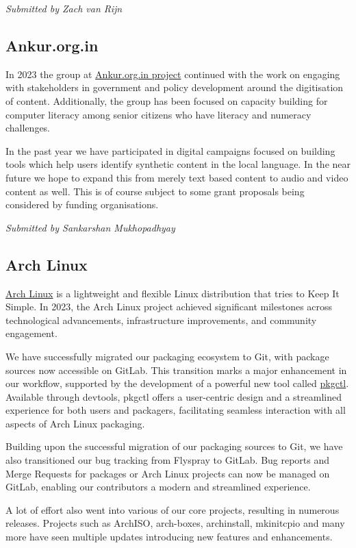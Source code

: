 \documentclass[a4paper]{report}
\begin{document}
{\em Submitted by Zach van Rijn}

\subsection{Ankur.org.in}

In 2023 the group at \href{http://ankur.org.in/}{Ankur.org.in project} continued with the work on engaging with stakeholders in government and policy development around the digitisation of content. Additionally, the group has been focused on capacity building for computer literacy among senior citizens who have literacy and numeracy challenges.

In the past year we have participated in digital campaigns focused on building tools which help users identify synthetic content in the local language. In the near future we hope to expand this from merely text based content to audio and video content as well. This is of course subject to some grant proposals being considered by funding organisations.

{\em Submitted by Sankarshan Mukhopadhyay}

\subsection{Arch Linux}

\href{https://archlinux.org/}{Arch Linux} is a lightweight and flexible Linux distribution that tries to Keep It Simple. In 2023, the Arch Linux project achieved significant milestones across technological advancements, infrastructure improvements, and community engagement.

We have successfully migrated our packaging ecosystem to Git, with package sources now accessible on GitLab. This transition marks a major enhancement in our workflow, supported by the development of a powerful new tool called \href{https://man.archlinux.org/man/pkgctl.1}{pkgctl}. Available through devtools, pkgctl offers a user-centric design and a streamlined experience for both users and packagers, facilitating seamless interaction with all aspects of Arch Linux packaging.

Building upon the successful migration of our packaging sources to Git, we have also transitioned our bug tracking from Flyspray to GitLab. Bug reports and Merge Requests for packages or Arch Linux projects can now be managed on GitLab, enabling our contributors a modern and streamlined experience.

A lot of effort also went into various of our core projects, resulting in numerous releases. Projects such as ArchISO, arch-boxes, archinstall, mkinitcpio and many more have seen multiple updates introducing new features and enhancements.
\end{document}
